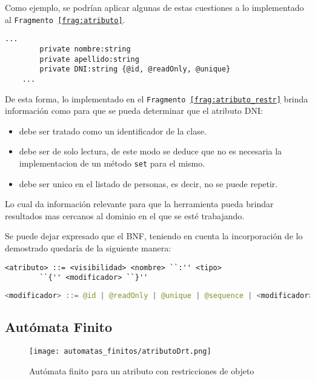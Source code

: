 Como ejemplo, se podrían aplicar algunas de estas cuestiones a lo implementado
al \texttt{Fragmento \ref{frag:atributo}}.

\begin{lstlisting}[label=frag:atributo_restr]
  ...
		private nombre:string
		private apellido:string
		private DNI:string {@id, @readOnly, @unique}
	...
\end{lstlisting}

De esta forma, lo implementado en el \texttt{Fragmento
\ref{frag:atributo_restr}} brinda información como para que se pueda determinar
que el atributo DNI:
\begin{itemize}
	\item debe ser tratado como un identificador de la clase.
	\item debe ser de solo lectura, de este modo se deduce que no es necesaria la
		implementacion de un método \texttt{set} para el mismo.
	\item debe ser unico en el listado de personas, es decir, no se puede
		repetir.
\end{itemize}

Lo cual da información relevante para que la herramienta pueda brindar
resultados mas cercanos al dominio en el que se esté trabajando.

Se puede dejar expresado que el BNF, teniendo en cuenta la incorporación de lo
demostrado quedaría de la siguiente manera:

\begin{lstlisting}[basicstyle=\ttfamily\footnotesize, label=frag:bnf_atributo_restr]
		<atributo> ::= <visibilidad> <nombre> ``:'' <tipo>
		``{'' <modificador> ``}''
\end{lstlisting}

\begin{lstlisting}[language=Java, basicstyle=\tiny\ttfamily, label=frag:bnf_atributo_modif]
		<modificador> ::= @id | @readOnly | @unique | @sequence | <modificador>
\end{lstlisting}

\subsection{Autómata Finito}
\begin{figure}[H]
	\centering
	\texttt{[image: automatas\_finitos/atributoDrt.png]}
	\caption{Autómata finito para un atributo con restricciones de objeto}
	\label{fig:af_atr_modif}
\end{figure}
